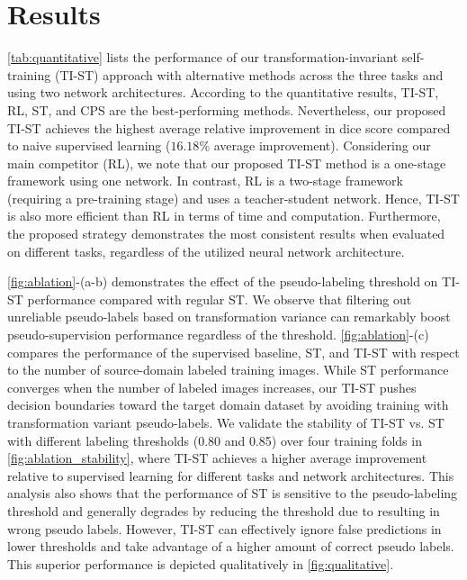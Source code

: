 \section{Results}
\label{sec:experimental_results_tist}



\cref{tab:quantitative} lists the performance of our transformation-invariant self-training (TI-ST) approach with alternative methods across the three tasks and using two network architectures. According to the quantitative results, TI-ST, RL, ST, and CPS are the best-performing methods. Nevertheless, our proposed TI-ST achieves the highest average relative improvement in dice score compared to naive supervised learning ($16.18\%$ average improvement). Considering our main competitor (RL), we note that our proposed TI-ST method is a one-stage framework using one network. In contrast, RL is a two-stage framework (requiring a pre-training stage) and uses a teacher-student network. Hence, TI-ST is also more efficient than RL in terms of time and computation.  Furthermore, the proposed strategy demonstrates the most consistent results when evaluated on different tasks, regardless of the utilized neural network architecture. 


\cref{fig:ablation}-(a-b) demonstrates the effect of the pseudo-labeling threshold on TI-ST performance compared with regular ST. We observe that filtering out unreliable pseudo-labels based on transformation variance can remarkably boost pseudo-supervision performance regardless of the threshold. \cref{fig:ablation}-(c) compares the performance of the supervised baseline, ST, and TI-ST with respect to the number of source-domain labeled training images. While ST performance converges when the number of labeled images increases, our TI-ST pushes decision boundaries toward the target domain dataset by avoiding training with transformation variant pseudo-labels. We validate the stability of TI-ST vs. ST  with different labeling thresholds (0.80 and 0.85) over four training folds in \cref{fig:ablation_stability}, where TI-ST achieves a higher average improvement relative to supervised learning for different tasks and network architectures. This analysis also shows that the performance of ST is sensitive to the pseudo-labeling threshold and generally degrades by reducing the threshold due to resulting in wrong pseudo labels. However, TI-ST can effectively ignore false predictions in lower thresholds and take advantage of a higher amount of correct pseudo labels. This superior performance is depicted qualitatively in \cref{fig:qualitative}.

